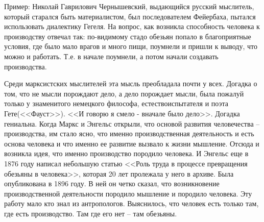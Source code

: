 Пример: Николай Гаврилович Чернышевский, выдающийся русский мыслитель, который старался быть материалистом, был последователем Фейербаха, пытался использовать диалектику Гегеля. На вопрос, как возникла способность человека к производству отвечал так: по-видимому стадо обезьян попало в благоприятные условия, где было мало врагов и много пищи, поумнели и пришли к выводу, что можно и работать. Т.е. в начале поумнели, а потом начали создавать производства.

Среди марксистских мыслителей эта мысль преобладала почти у всех. Догадка о том, что не мысли порождают дело, а дело порождает мысли, была пожалуй только у знаменитого немецкого философа, естествоиспытателя и поэта Гете(<<Фауст>>). <<И говорю я смело - вначале было дело>>. Догадка гениальна. Когда Маркс и Энгельс открыли, что основой развития человечества – производства, им стало ясно, что именно производственная деятельность и есть основа человека и что именно ее развитие вызвало к жизни мышление. Отсюда и возникла идея, что именно производство породило человека. И Энгельс еще в 1876 году написал небольшую статью <<Роль труда в процессе превращения обезьяны в человека>>, которая 20 лет пролежала у него в архиве. Была опубликована в 1896 году. В ней он четко сказал, что возникновение производственной деятельности породило мышление и породило человека. Эту работу мало кто знал из антропологов. Выяснилось, что человек есть только там, где есть производство. Там где его нет – там обезьяны.

